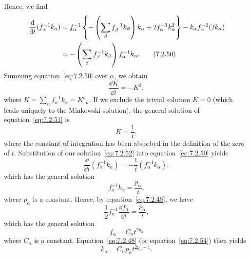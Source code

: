 Hence, we find
\begin{align}
  \frac{\mathop{}\!\mathrm{d}}{\mathop{}\!\mathrm{d} t}(f_\alpha^{-1}k_\alpha)
    &=f_\alpha^{-1}
      \left\{
        -\left(\sum_\beta f_\beta^{-1}k_\beta\right)k_\alpha
        +2f_\alpha^{-1}k_\alpha^2
      \right\}
      -k_\alpha f_\alpha^{-2}(2k_\alpha) \notag\\
    &=-\left(\sum_\beta f_\beta^{-1}k_\beta\right)
      f_\alpha^{-1}k_\alpha .
  \tag{7.2.50}\label{eq:7.2.50}
\end{align}
Summing equation~\eqref{eq:7.2.50} over \(\alpha\), we obtain
\begin{equation}
  \frac{\dd K}{\dd t}=-K^2 ,
  \tag{7.2.51}\label{eq:7.2.51}
\end{equation}
where \(K=\sum_\alpha f_\alpha^{-1}k_\alpha=K^a{}_a\). If we exclude the
trivial solution \(K=0\) (which leads uniquely to the Minkowski solution), the
general solution of equation~\eqref{eq:7.2.51} is
\begin{equation}
  K=\frac1t ,
  \tag{7.2.52}\label{eq:7.2.52}
\end{equation}
where the constant of integration has been absorbed in the definition of the zero of
\(t\). Substitution of our solution~\eqref{eq:7.2.52} into
equation~\eqref{eq:7.2.50} yields
\begin{equation}
  \frac{\dd}{\dd t}(f_\alpha^{-1}k_\alpha)
    =-\frac1t(f_\alpha^{-1}k_\alpha) ,
  \tag{7.2.53}\label{eq:7.2.53}
\end{equation}
which has the general solution
\begin{equation}
  f_\alpha^{-1}k_\alpha=\frac{p_\alpha}{t} ,
  \tag{7.2.54}\label{eq:7.2.54}
\end{equation}
where \(p_\alpha\) is a constant. Hence, by equation~\eqref{eq:7.2.48}, we have
\begin{equation}
  \frac12f_\alpha^{-1}\frac{\dd f_\alpha}{\dd t}
    =\frac{p_\alpha}{t} ,
  \tag{7.2.55}\label{eq:7.2.55}
\end{equation}
which has the general solution
\begin{equation}
  f_\alpha=C_\alpha t^{2p_\alpha}
  \tag{7.2.56}\label{eq:7.2.56}
\end{equation}
where \(C_\alpha\) is a constant. Equation~\eqref{eq:7.2.48} (or
equation~\eqref{eq:7.2.54}) then yields
\begin{equation}
  k_\alpha=C_\alpha p_\alpha t^{2p_\alpha-1} .
  \tag{7.2.57}\label{eq:7.2.57}
\end{equation}
